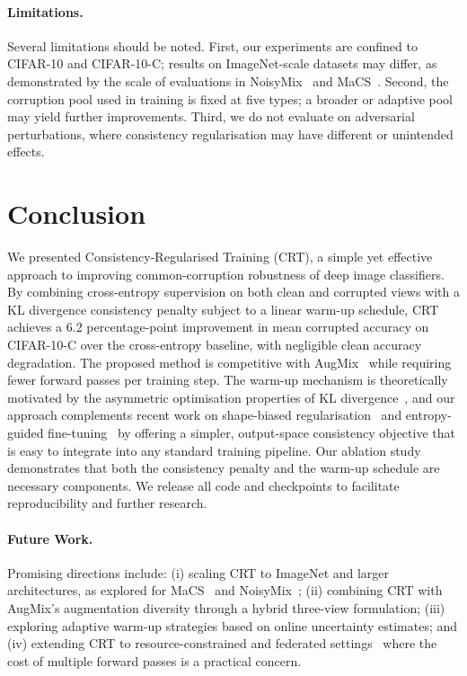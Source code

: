\documentclass[10pt,twocolumn]{article}
\begin{document}
\paragraph{Limitations.} Several limitations should be noted. First, our experiments are confined to CIFAR-10 and CIFAR-10-C; results on ImageNet-scale datasets may differ, as demonstrated by the scale of evaluations in NoisyMix~\cite{erichson2024noisymix} and MaCS~\cite{khazem2026macs}. Second, the corruption pool used in training is fixed at five types; a broader or adaptive pool may yield further improvements. Third, we do not evaluate on adversarial perturbations, where consistency regularisation may have different or unintended effects.

\section{Conclusion}

We presented Consistency-Regularised Training (CRT), a simple yet effective approach to improving common-corruption robustness of deep image classifiers. By combining cross-entropy supervision on both clean and corrupted views with a KL divergence consistency penalty subject to a linear warm-up schedule, CRT achieves a 6.2 percentage-point improvement in mean corrupted accuracy on CIFAR-10-C over the cross-entropy baseline, with negligible clean accuracy degradation. The proposed method is competitive with AugMix~\cite{hendrycks2020augmix} while requiring fewer forward passes per training step. The warm-up mechanism is theoretically motivated by the asymmetric optimisation properties of KL divergence~\cite{cui2025gkl}, and our approach complements recent work on shape-biased regularisation~\cite{ranabhat2025shapebias} and entropy-guided fine-tuning~\cite{kumar2026demhec} by offering a simpler, output-space consistency objective that is easy to integrate into any standard training pipeline. Our ablation study demonstrates that both the consistency penalty and the warm-up schedule are necessary components. We release all code and checkpoints to facilitate reproducibility and further research.

\paragraph{Future Work.} Promising directions include: (i) scaling CRT to ImageNet and larger architectures, as explored for MaCS~\cite{khazem2026macs} and NoisyMix~\cite{erichson2024noisymix}; (ii) combining CRT with AugMix's augmentation diversity through a hybrid three-view formulation; (iii) exploring adaptive warm-up strategies based on online uncertainty estimates; and (iv) extending CRT to resource-constrained and federated settings~\cite{bekdache2025federl} where the cost of multiple forward passes is a practical concern.
\end{document}
